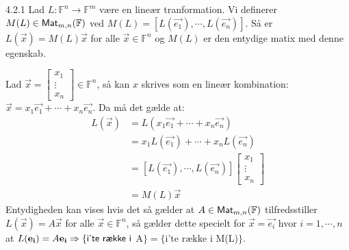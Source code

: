 \begin{saetning}{4.2.1}
	Lad $L: \mathbb{F}^n \rightarrow \mathbb{F}^m$ være en lineær tranformation.	
	Vi definerer $M(L) \in \textsf{Mat}_{m,n}(\mathbb{F})$ ved $M(L) = [L(\vec{e_1}), 
	\cdots, L(\vec{e_n})]$.
	Så er $L(\vec{x}) = M(L)\vec{x}$ for alle $\vec{x} \in \mathbb{F}^n$ og 
	$M(L)$ er den entydige matix med denne egenskab.
\end{saetning}

\begin{bevis}
	Lad $\vec{x} = \begin{bmatrix}x_1\\ \vdots \\ x_n\end{bmatrix} \in 
	\mathbb{F}^n$, så kan $x$ skrives som en lineær kombination: $\vec{x} = 
	x_1\vec{e_1} + \cdots + x_n\vec{e_n}$. Da må det gælde at:
	\begin{align*}	
		L(\vec{x}) &= L(x_1\vec{e_1} + \cdots + x_n\vec{e_n}) \\
				   &= x_1L(\vec{e_1}) + \cdots + x_nL(\vec{e_n}) \\
				   &= [L(\vec{e_1}), \cdots, L(\vec{e_n})]
					\begin{bmatrix}
						x_1 \\
						\vdots \\
						x_n
					\end{bmatrix} \\
				   &= M(L)\vec{x}
	\end{align*}
	Entydigheden kan vises hvis det så gælder at $A \in \textsf{Mat}_{m,n}(\mathbb{F})$ 
	tilfredsstiller $L(\vec{x}) = A\vec{x}$ for alle $\vec{x} \in 
	\mathbb{F}^n$, så gælder dette specielt for $\vec{x} = \vec{e_i}$ hvor
	$i = 1, \cdots, n$ at $L(\mathbf{e_i}) = A\mathbf{e_i} \Rightarrow \{\textsf{i'te række i } 
	$A$\} = \{\text{i'te række i }$M(L)$\}$.
\end{bevis}
